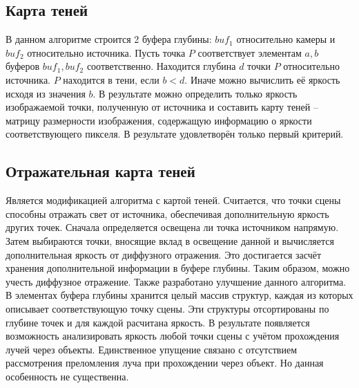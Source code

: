 {    \subsection{Карта теней} {
        \hspace{1.25cm}
        В данном алгоритме строится 2 буфера глубины:
        $buf_1$ относительно камеры и $buf_2$ относительно источника.
        Пусть точка $P$ соответствует элементам $a, b$
        буферов $buf_1, buf_2$ соответственно.
        Находится глубина $d$ точки $P$ относительно источника.
        $P$ находится в тени, если $b < d$.
        Иначе можно вычислить её яркость исходя из значения $b$.
        В результате можно определить только яркость изображаемой точки, полученную от источника и составить карту теней -- матрицу размерности изображения,
        содержащую информацию о яркости соответствующего пикселя.
        В результате удовлетворён только первый критерий.
    }
    \subsection{Отражательная карта теней} {
        \hspace{1.25cm}
        Является модификацией алгоритма с картой теней.
        Считается, что точки сцены способны отражать свет от источника, обеспечивая
        дополнительную яркость других точек.
        Сначала определяется освещена ли точка источником напрямую.
        Затем выбираются точки, вносящие вклад в освещение данной и вычисляется
        дополнительная яркость от диффузного отражения.
        Это достигается засчёт хранения дополнительной информации в буфере глубины.
        Таким образом, можно учесть диффузное отражение.
        Также разработано улучшение данного алгоритма.
        В элементах буфера глубины хранится целый массив структур, каждая из которых
        описывает соответствующую точку сцены.
        Эти структуры отсортированы по глубине точек и для каждой расчитана яркость.
        В результате появляется возможность анализировать яркость любой точки сцены
        с учётом прохождения лучей через объекты.
        Единственное упущение связано с отсутствием рассмотрения преломления
        луча при прохождении через объект.
        Но данная особенность не существенна.
    }

}
